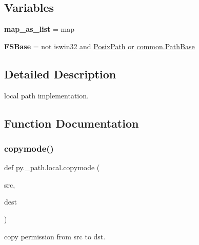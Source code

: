 \subsection*{Variables}
\begin{DoxyCompactItemize}
\item 
\mbox{\label{namespacepy_1_1__path_1_1local_ae30eae1d3b5940b1c7bf2346ad642517}} 
{\bfseries map\+\_\+as\+\_\+list} = map
\item 
\mbox{\label{namespacepy_1_1__path_1_1local_a907de214dc5aaa0d7c82451a20880f9c}} 
{\bfseries F\+S\+Base} = not iswin32 and \hyperlink{classpy_1_1__path_1_1local_1_1_posix_path}{Posix\+Path} or \hyperlink{classpy_1_1__path_1_1common_1_1_path_base}{common.\+Path\+Base}
\end{DoxyCompactItemize}


\subsection{Detailed Description}
\begin{DoxyVerb}local path implementation.
\end{DoxyVerb}
 

\subsection{Function Documentation}
\mbox{\label{namespacepy_1_1__path_1_1local_aff48f6647a92b496eb0a281e1227d202}} 
\subsubsection{\texorpdfstring{copymode()}{copymode()}}
{\footnotesize\ttfamily def py.\+\_\+path.\+local.\+copymode (\begin{DoxyParamCaption}\item[{}]{src,  }\item[{}]{dest }\end{DoxyParamCaption})}

\begin{DoxyVerb}copy permission from src to dst. \end{DoxyVerb}
 \mbox{\label{namespacepy_1_1__path_1_1local_ad9c74f26f1e8066b942ae6ff27173be5}} 
